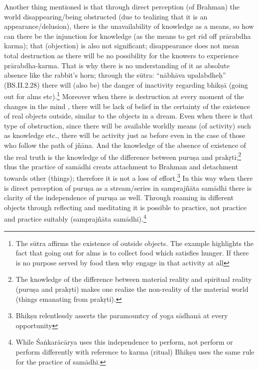 Another thing mentioned is that through direct perception (of Brahman) the world disappearing/being obstructed (due to tealizing that it is an appearance/delusion), there is the unavailability of knowledge as a means, so how can there be the injunction for knowledge (as the means to get rid off prārabdha karma); that (objection) is also not significant; disappearance does not mean total destruction as there will be no possibility for the knowers to experience prārabdha-karma. That is why there is no understanding of it as absolute absence like the rabbit’s horn; through the sūtra: “nābhāva upalabdheḥ” (BS.II.2.28) there will (also be) the danger of inactivity regarding bhikṣā (going out for alms etc).\footnote{The sūtra affirms the existence of outside objects. The example highlights the fact that going out for alms is to collect food which satisfies hunger. If there is no purpose served by food then why engage in that activity at all}  Moreover when there is destruction at every moment of the changes in the mind , there will be lack of belief in the certainty of the existence of real objects outside, similar to the objects in a dream. Even when there is that type of obstruction, since there will be available worldly means (of activity) such as knowledge etc., there will be activity just as before even in the case of those who follow the path of jñāna. And the knowledge of the absence of existence of the real truth is the knowledge of the difference between puruṣa and prakṛti;\footnote{The knowledge of the difference between material reality and spiritual reality (puruṣa and prakṛti) makes one realize the non-reality of the material world (things emanating from prakṛti).} thus the practice of samādhi creats attachment to Brahman and detachment towards other (things); therefore it is not a loss of effort.\footnote{Bhikṣu relentlessly asserts the paramountcy of yoga sādhanā at every opportunity} In this way when there is direct perception of puruṣa as a stream/series in samprajñāta samādhi there is clarity of the independence of puruṣa as well. Through roaming in different objects through reflecting and meditating it is possible to practice, not practice and practice suitably (samprajñāta samādhi).\footnote{While Śaṅkarācārya uses this independence to perform, not perform or perform differently with reference to karma (ritual) Bhikṣu uses the same rule for the practice of samādhi.} 

